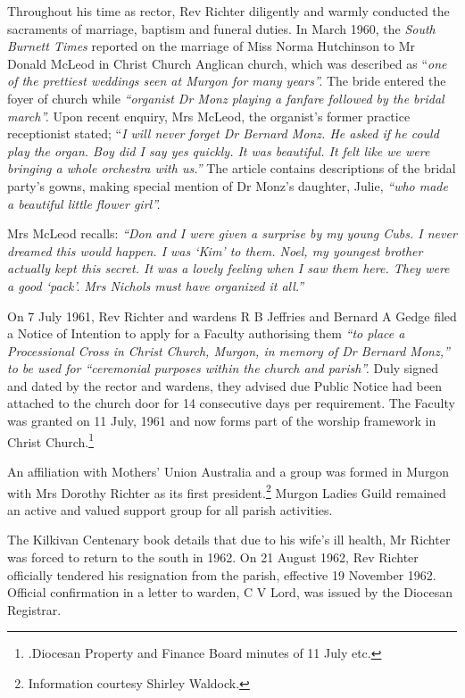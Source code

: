 Throughout his time as rector, Rev Richter diligently and warmly conducted the sacraments of marriage, baptism and funeral duties. In March 1960, the \emph{South Burnett Times} reported on the marriage of Miss Norma Hutchinson to Mr Donald McLeod in Christ Church Anglican church, which was described as ``\emph{one of the prettiest weddings seen at Murgon for many years''.} The bride entered the foyer of church while \emph{``organist Dr Monz playing a fanfare followed by the bridal march''.} Upon recent enquiry, Mrs McLeod, the organist's former practice receptionist stated; ``\emph{I will never forget Dr Bernard Monz. He asked if he could play the organ. Boy did I say yes quickly. It was beautiful. It felt like we were bringing a whole orchestra with us.''} The article contains descriptions of the bridal party's gowns, making special mention of Dr Monz's daughter, Julie, \emph{``who made a beautiful little flower girl''.}



Mrs McLeod recalls: \emph{``Don and I were given a surprise by my young Cubs. I never dreamed this would happen. I was `Kim' to them. Noel, my youngest brother actually kept this secret. It was a lovely feeling when I saw them here. They were a good `pack'. Mrs Nichols must have organized it all.''}



On 7 July 1961, Rev Richter and wardens R B Jeffries and Bernard A Gedge filed a Notice of Intention to apply for a Faculty authorising them \emph{``to place a Processional Cross in Christ Church, Murgon, in memory of Dr Bernard Monz,'' to be used for ``ceremonial purposes within the church and parish''.} Duly signed and dated by the rector and wardens, they advised due Public Notice had been attached to the church door for 14 consecutive days per requirement. The Faculty was granted on 11 July, 1961 and now forms part of the worship framework in Christ Church.\footnote{.Diocesan Property and Finance Board minutes of 11 July etc.}


An affiliation with Mothers' Union Australia and a group was formed in Murgon with Mrs Dorothy Richter as its first president.\footnote{Information courtesy Shirley Waldock.} Murgon Ladies Guild remained an active and valued support group for all parish activities.


The Kilkivan Centenary book details that due to his wife's ill health, Mr Richter was forced to return to the south in 1962. On 21 August 1962, Rev Richter officially tendered his resignation from the parish, effective 19 November 1962. Official confirmation in a letter to warden, C V Lord, was issued by the Diocesan Registrar.



